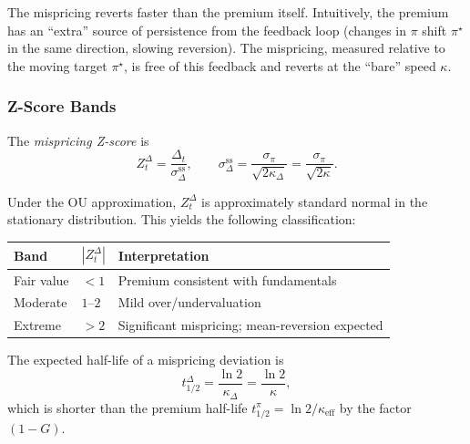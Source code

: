 \begin{remark}
  The mispricing reverts faster than the premium itself.  Intuitively,
  the premium has an ``extra'' source of persistence from the feedback loop
  (changes in $\pi$ shift $\pi^\star$ in the same direction, slowing
  reversion).  The mispricing, measured relative to the moving target
  $\pi^\star$, is free of this feedback and reverts at the ``bare'' speed
  $\kappa$.
\end{remark}

\subsubsection{Z-Score Bands}
\label{sec:zscore}

\begin{definition}
  \label{def:zscore}
  The \emph{mispricing Z-score} is
  \begin{equation}
    \label{eq:zscore}
    Z_t^{\Delta} = \frac{\Delta_t}{\sigma_\Delta^{\mathrm{ss}}},
    \qquad
    \sigma_\Delta^{\mathrm{ss}}
    = \frac{\sigma_\pi}{\sqrt{2\kappa_\Delta}}
    = \frac{\sigma_\pi}{\sqrt{2\kappa}}.
  \end{equation}
\end{definition}

Under the OU approximation, $Z_t^\Delta$ is approximately standard normal in
the stationary distribution.  This yields the following classification:

\begin{center}
\begin{tabular}{lll}
  \toprule
  \textbf{Band} & \textbf{$|Z_t^\Delta|$} & \textbf{Interpretation} \\
  \midrule
  Fair value    & $< 1$   & Premium consistent with fundamentals \\
  Moderate      & $1$--$2$ & Mild over/undervaluation \\
  Extreme       & $> 2$   & Significant mispricing; mean-reversion expected \\
  \bottomrule
\end{tabular}
\end{center}

\begin{proposition}
  \label{prop:halflife}
  The expected half-life of a mispricing deviation is
  \begin{equation}
    \label{eq:halflife}
    t_{1/2}^{\Delta} = \frac{\ln 2}{\kappa_\Delta} = \frac{\ln 2}{\kappa},
  \end{equation}
  which is shorter than the premium half-life
  $t_{1/2}^{\pi} = \ln 2 / \kappa_{\mathrm{eff}}$ by the factor $(1-G)$.
\end{proposition}

